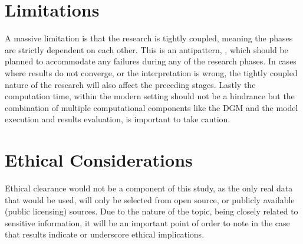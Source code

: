 \section{Limitations}
A massive limitation is that the research is tightly coupled, meaning the phases are strictly dependent on each other. This is an antipattern, \parencite{joshi_beginning_2016}, which should be planned to accommodate any failures during any of the research phases. In cases where results do not converge, or the interpretation is wrong, the tightly coupled nature of the research will also affect the preceding stages. Lastly the computation time, within the modern setting should not be a hindrance but the combination of multiple computational components like the DGM and the model execution and results evaluation, is important to take caution. 

\section{Ethical Considerations}
Ethical clearance would not be a component of this study, as the only real data that would be used, will only be selected from open source, or publicly available (public licensing) sources. Due to the nature of the topic, being closely related to sensitive information, it will be an important point of order to note in the case that results indicate or underscore ethical implications.


